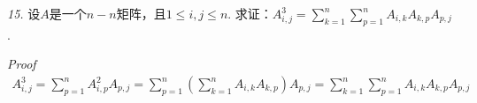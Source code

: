 \hspace*{\fill}

\textit{15.}
设\(A\)是一个\(n-n\)矩阵，且\(1 \leq i,j \leq n\).
求证：\(A^3_{i,j}=\sum_{k=1}^n \sum_{p=1}^n A_{i,k}A_{k,p}A_{p,j}\).

\textit{Proof}
    \begin{align*}
        A^3_{i,j}=\sum_{p=1}^n A^2_{i,p}A_{p,j}
        =\sum_{p=1}^n (\sum_{k=1}^n A_{i,k}A_{k,p})A_{p,j}
        =\sum_{k=1}^n \sum_{p=1}^n A_{i,k}A_{k,p}A_{p,j}
    \end{align*}